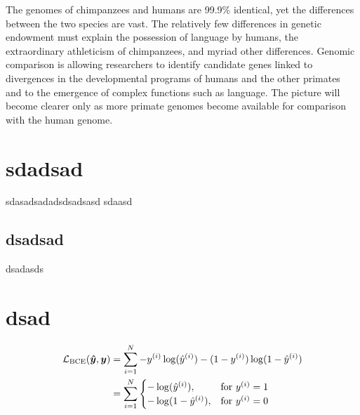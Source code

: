 \documentclass[]{subook}
\begin{document}
    The genomes of chimpanzees and humans are 99.9\% identical, yet the differences between the two species are vast. The relatively few differences in genetic endowment must explain the possession of language by humans, the extraordinary athleticism of chimpanzees, and myriad other differences. Genomic comparison is allowing researchers to identify candidate genes linked to divergences in the developmental programs of humans and the other primates
    and to the emergence of complex functions such as language. The picture will become clearer only as more primate genomes become available for comparison with the human genome.



    \section{sdadsad}
    sdasadsadadsdsadsasd sdaasd
    \lipsum[1-3]
    \subsection{dsadsad}
    dsadasds
    \lipsum[1-4]
    \section{dsad}
    \lipsum[2-6]

    
\begin{definition}[ds]
    \begin{equation}
        \begin{aligned}
            \mathcal{L} _{\rm{BCE}}(\boldsymbol{\hat{y} },\boldsymbol{y})&=\sum ^N_{i=1}-y^{(i)}\log (\hat{y}^{(i)})- (1-y^{(i)})\log (1-\hat{y}^{(i)})\\
            &=\sum^N_{i=1}
            \begin{cases}
            -\log (\hat{y}^{(i)}),  & \text{for $y^{(i)}=1$} \\
            -\log (1-\hat{y}^{(i)}), & \text{for $y^{(i)}=0$}
            \end{cases}
        \end{aligned}
    \end{equation}
\end{definition}
\end{document}
